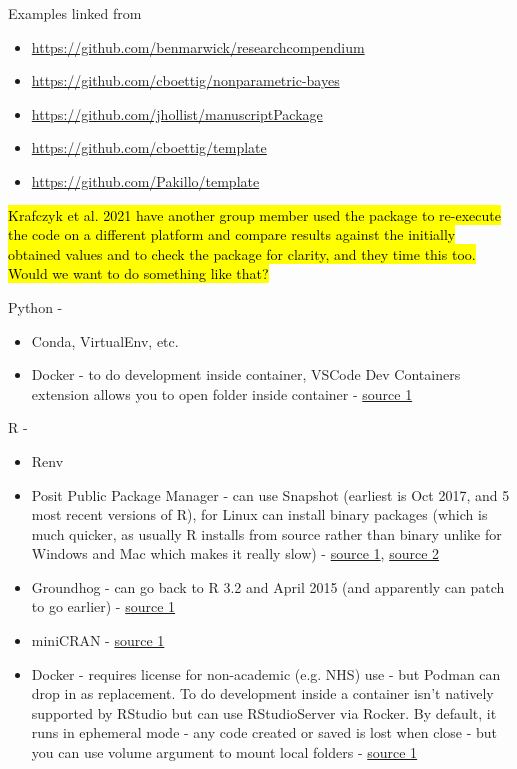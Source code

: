 Examples linked from \autocite{marwick_packaging_2018}
\begin{itemize}
    \item \url{https://github.com/benmarwick/researchcompendium}
    \item \url{https://github.com/cboettig/nonparametric-bayes}
    \item \url{https://github.com/jhollist/manuscriptPackage}
    \item \url{https://github.com/cboettig/template}
    \item \url{https://github.com/Pakillo/template}
\end{itemize}

\hl{Krafczyk et al. 2021 have another group member used the package to re-execute the code on a different platform and compare results against the initially obtained values and to check the package for clarity, and they time this too. Would we want to do something like that?}

Python -
\begin{itemize}
    \item Conda, VirtualEnv, etc.
    \item Docker - to do development inside container, VSCode Dev Containers extension allows you to open folder inside container - \href{https://code.visualstudio.com/docs/devcontainers/containers}{source 1}
\end{itemize}

R -
\begin{itemize}
    \item Renv
    \item Posit Public Package Manager - can use Snapshot (earliest is Oct 2017, and 5 most recent versions of R), for Linux can install binary packages (which is much quicker, as usually R installs from source rather than binary unlike for Windows and Mac which makes it really slow) - \href{https://packagemanager.posit.co/client/#/repos/cran/setup}{source 1}, \href{https://docs.posit.co/faq/p3m-faq/#frequently-asked-questions}{source 2}
    \item Groundhog - can go back to R 3.2 and April 2015 (and apparently can patch to go earlier) - \href{https://www.brodrigues.co/blog/2023-01-12-repro_r/}{source 1}
    \item miniCRAN - \href{https://learn.microsoft.com/en-us/sql/machine-learning/package-management/create-a-local-package-repository-using-minicran?view=sql-server-ver16}{source 1}
    \item Docker - requires license for non-academic (e.g. NHS) use - but Podman can drop in as replacement. To do development inside a container isn't natively supported by RStudio but can use RStudioServer via Rocker. By default, it runs in ephemeral mode - any code created or saved is lost when close - but you can use volume argument to mount local folders - \href{https://towardsdatascience.com/running-rstudio-inside-a-container-e9db5e809ff8}{source 1}
\end{itemize}

